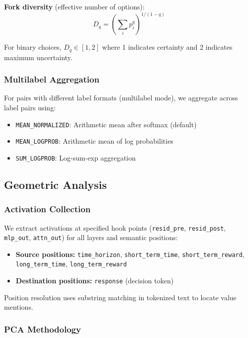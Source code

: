 \documentclass{article}
\begin{document}
\textbf{Fork diversity} (effective number of options):
\begin{equation}
D_q = \left(\sum_i p_i^q\right)^{1/(1-q)}
\end{equation}

For binary choices, $D_q \in [1, 2]$ where 1 indicates certainty and 2 indicates maximum uncertainty.

\subsubsection{Multilabel Aggregation}

For pairs with different label formats (multilabel mode), we aggregate across label pairs using:
\begin{itemize}
    \item \texttt{MEAN\_NORMALIZED}: Arithmetic mean after softmax (default)
    \item \texttt{MEAN\_LOGPROB}: Arithmetic mean of log probabilities
    \item \texttt{SUM\_LOGPROB}: Log-sum-exp aggregation
\end{itemize}

\subsection{Geometric Analysis}

\subsubsection{Activation Collection}

We extract activations at specified hook points (\texttt{resid\_pre}, \texttt{resid\_post}, \texttt{mlp\_out}, \texttt{attn\_out}) for all layers and semantic positions:
\begin{itemize}
    \item \textbf{Source positions:} \texttt{time\_horizon}, \texttt{short\_term\_time}, \texttt{short\_term\_reward}, \texttt{long\_term\_time}, \texttt{long\_term\_reward}
    \item \textbf{Destination positions:} \texttt{response} (decision token)
\end{itemize}

Position resolution uses substring matching in tokenized text to locate value mentions.

\subsubsection{PCA Methodology}
\end{document}
